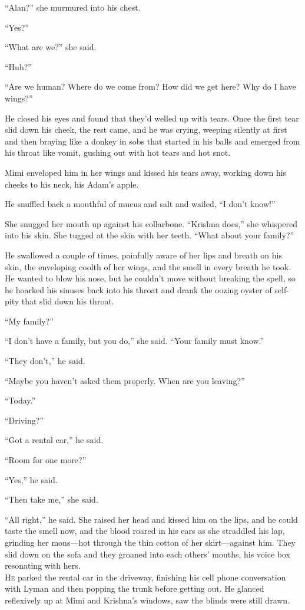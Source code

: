 ``Alan?'' she murmured into his chest.

``Yes?''

``What are we?'' she said.

``Huh?''

``Are we human?  Where do we come from?  How did we get here?  Why do
I have wings?''

He closed his eyes and found that they'd welled up with tears.  Once
the first tear slid down his cheek, the rest came, and he was crying,
weeping silently at first and then braying like a donkey in sobs that
started in his balls and emerged from his throat like vomit, gushing
out with hot tears and hot snot.

Mimi enveloped him in her wings and kissed his tears away, working
down his cheeks to his neck, his Adam's apple.

He snuffled back a mouthful of mucus and salt and wailed, ``I don't
know!''

She snugged her mouth up against his collarbone.  ``Krishna does,''
she whispered into his skin.  She tugged at the skin with her teeth. 
``What about your family?''

He swallowed a couple of times, painfully aware of her lips and breath
on his skin, the enveloping coolth of her wings, and the smell in
every breath he took.  He wanted to blow his nose, but he couldn't
move without breaking the spell, so he hoarked his sinuses back into
his throat and drank the oozing oyster of self-pity that slid down his
throat.

``My family?''

``I don't have a family, but you do,'' she said.  ``Your family must
know.''

``They don't,'' he said.

``Maybe you haven't asked them properly.  When are you leaving?''

``Today.''

``Driving?''

``Got a rental car,'' he said.

``Room for one more?''

``Yes,'' he said.

``Then take me,'' she said.

``All right,'' he said.  She raised her head and kissed him on the
lips, and he could taste the smell now, and the blood roared in his
ears as she straddled his lap, grinding her mons---hot through the
thin cotton of her skirt---against him.  They slid down on the sofa
and they groaned into each others' mouths, his voice box resonating
with hers.
\\
\lettrine[lines=3, lhang=.5, nindent=0pt, findent=2pt]{H}{e} parked the rental car in the driveway, finishing his cell phone
conversation with Lyman and then popping the trunk before getting out. 
He glanced reflexively up at Mimi and Krishna's windows, saw the
blinds were still drawn.

